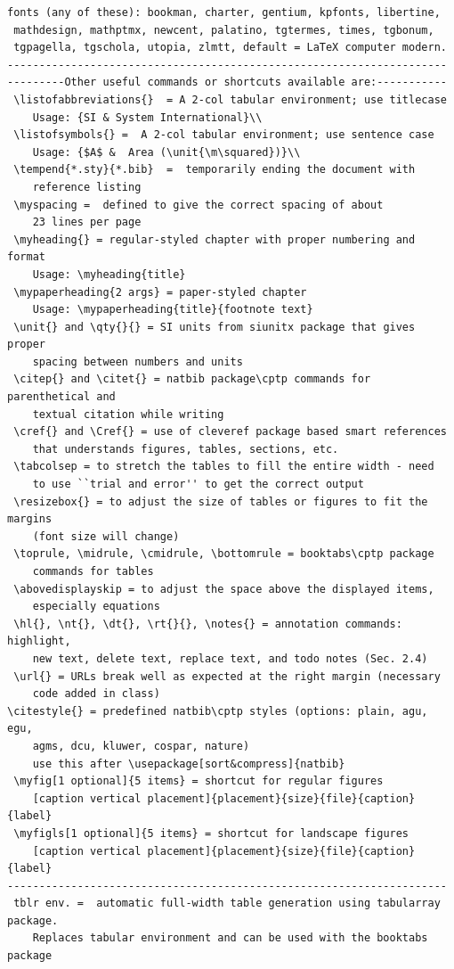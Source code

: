 \documentclass[phd,showframe]{ndsu-thesis-2022}
\renewcommand\myspacing{1.9} %
\begin{document}
\begin{lstlisting}[basicstyle=\ttfamily\footnotesize\color{blue}]
 fonts (any of these): bookman, charter, gentium, kpfonts, libertine, 
 mathdesign, mathptmx, newcent, palatino, tgtermes, times, tgbonum, 
 tgpagella, tgschola, utopia, zlmtt, default = LaTeX computer modern. 
---------------------------------------------------------------------
---------Other useful commands or shortcuts available are:-----------
 \listofabbreviations{}  = A 2-col tabular environment; use titlecase 
 	Usage: {SI & System International}\\
 \listofsymbols{} =  A 2-col tabular environment; use sentence case
 	Usage: {$A$ &  Area (\unit{\m\squared})}\\
 \tempend{*.sty}{*.bib}  =  temporarily ending the document with 
 	reference listing
 \myspacing =  defined to give the correct spacing of about 
 	23 lines per page
 \myheading{} = regular-styled chapter with proper numbering and format
 	Usage: \myheading{title}
 \mypaperheading{2 args} = paper-styled chapter 
 	Usage: \mypaperheading{title}{footnote text}
 \unit{} and \qty{}{} = SI units from siunitx package that gives proper 
 	spacing between numbers and units
 \citep{} and \citet{} = natbib package\cptp commands for parenthetical and 
 	textual citation while writing 
 \cref{} and \Cref{} = use of cleveref package based smart references 
 	that understands figures, tables, sections, etc. 
 \tabcolsep = to stretch the tables to fill the entire width - need
 	to use ``trial and error'' to get the correct output
 \resizebox{} = to adjust the size of tables or figures to fit the margins 
 	(font size will change)
 \toprule, \midrule, \cmidrule, \bottomrule = booktabs\cptp package 
 	commands for tables
 \abovedisplayskip = to adjust the space above the displayed items, 
 	especially equations 
 \hl{}, \nt{}, \dt{}, \rt{}{}, \notes{} = annotation commands: highlight, 
 	new text, delete text, replace text, and todo notes (Sec. 2.4)
 \url{} = URLs break well as expected at the right margin (necessary 
 	code added in class)	
\citestyle{} = predefined natbib\cptp styles (options: plain, agu, egu, 
	agms, dcu, kluwer, cospar, nature) 
	use this after \usepackage[sort&compress]{natbib}
 \myfig[1 optional]{5 items} = shortcut for regular figures 
 	[caption vertical placement]{placement}{size}{file}{caption}{label}
 \myfigls[1 optional]{5 items} = shortcut for landscape figures 
 	[caption vertical placement]{placement}{size}{file}{caption}{label}	
---------------------------------------------------------------------
 tblr env. =  automatic full-width table generation using tabularray package. 
 	Replaces tabular environment and can be used with the booktabs package

\end{lstlisting}
\end{document}
